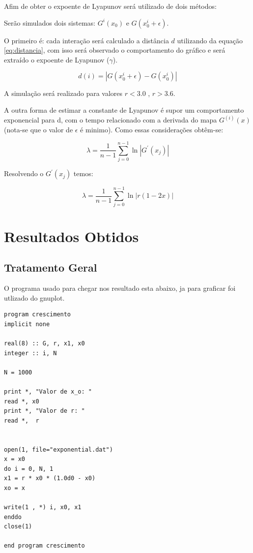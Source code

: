 \documentclass[a4paper, 12pt]{article}
\begin{document}
Afim de obter o expoente de Lyapunov será utilizado de dois métodos:


Serão simulados dois sistemas: $G^{i}(x_0)$  e $G(x_0^{i} + \epsilon)$.

O primeiro é:  cada interação será calculado a distância $d$ utilizando da equação \ref{eq:distancia}, com
isso será observado o comportamento do gráfico e será extraído o  expoente de Lyapunov ($\gamma$).

\begin{equation}
  d(i) = | G(x_0^{i} + \epsilon) - G(x_0^{i})|
  \label{eq:distancia}
\end{equation}


A simulação será realizado para valores $r <  3.0$ , $ r > 3.6$.


A outra forma de estimar a constante de Lyapunov é supor um comportamento exponencial para d, com o tempo
relacionado com a derivada do mapa $G^{(i)}(x)$ (nota-se que o valor de $\epsilon$ é minimo). Como essas considerações obtêm-se:

\begin{equation} 
  \lambda = \frac{1}{n - 1} \sum_{j = 0}^{n - 1} \ln | G^{'} (x_j) | 
  \label{eq:lambda_intermediary}
\end{equation}

Resolvendo o $G^{'}(x_j)$ temos:

\begin{equation} 
  \lambda = \frac{1}{n - 1} \sum_{j = 0}^{n - 1} \ln|r (1 - 2 x) |
  \label{eq:lambda}
\end{equation}



\section{Resultados Obtidos}

\subsection{Tratamento Geral}

O programa usado para chegar nos resultado esta abaixo, ja para graficar foi utlizado do gnuplot. 

\lstset{language=FORTRAN}
\begin{lstlisting}
program crescimento
implicit none

real(8) :: G, r, x1, x0
integer :: i, N

N = 1000

print *, "Valor de x_o: "
read *, x0
print *, "Valor de r: "
read *,  r


open(1, file="exponential.dat")
x = x0
do i = 0, N, 1
x1 = r * x0 * (1.0d0 - x0)
xo = x

write(1 , *) i, x0, x1
enddo
close(1)

end program crescimento


\end{lstlisting}
\end{document}
